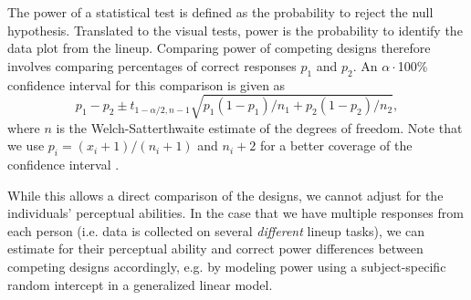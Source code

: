 
The power of a statistical test is defined as the probability to reject the null hypothesis. Translated to the visual tests, power is the probability to identify the data plot from the lineup. 
Comparing power of competing designs therefore involves comparing percentages of correct responses $p_1$ and $p_2$. An $\alpha\cdot$100\% confidence interval for this comparison is given as 
\[
p_1 - p_2 \pm t_{1-\alpha/2, n-1} \sqrt{p_1(1-p_1)/n_1 + p_2(1-p_2)/n_2},
\]
where $n$ is the Welch-Satterthwaite \cite{welch:1947} estimate of the degrees of freedom. Note that we use $p_i = (x_i+1)/(n_i+1)$ and $n_i+2$ for a better coverage of the confidence interval \cite{agresti:1998}.

While this allows a direct comparison of the designs, we cannot adjust for the individuals' perceptual abilities.
In the case that we have multiple responses from each person (i.e. data is collected on several {\it different} lineup tasks), we can estimate for their perceptual ability and correct power differences between competing designs accordingly, e.g. by modeling power using  a subject-specific random intercept in a generalized linear model.







